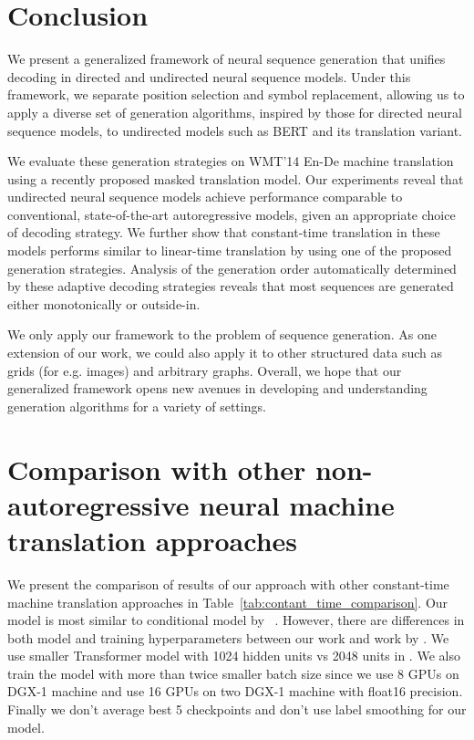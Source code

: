 \documentclass{article}
\begin{document}
\section{Conclusion}

We present a generalized framework of neural sequence generation that unifies decoding in directed and undirected neural sequence models. Under this framework, we separate position selection and symbol replacement, allowing us to apply a diverse set of generation algorithms, inspired by those for directed neural sequence models, to undirected models such as BERT and its translation variant. 

We evaluate these generation strategies on WMT'14 En-De machine translation using a recently proposed masked translation model. 
Our experiments reveal that undirected neural sequence models achieve performance comparable to conventional, state-of-the-art autoregressive models, given an appropriate choice of decoding strategy. 
We further show that constant-time translation in these models performs similar to linear-time translation by using one of the proposed generation strategies. Analysis of the generation order automatically determined by these adaptive decoding strategies reveals that most sequences are generated either monotonically or outside-in.

We only apply our framework to the problem of sequence generation. As one extension of our work, we could also apply it to other structured data such as grids (for e.g. images) and arbitrary graphs. Overall, we hope that our generalized framework opens new avenues in developing and understanding generation algorithms for a variety of settings.



\clearpage
\appendix
\section{Comparison with other non-autoregressive neural machine translation approaches}\label{ax:nonautoregressive}
We present the comparison of results of our approach with other constant-time machine translation approaches in Table~\ref{tab:contant_time_comparison}. Our model is most similar to conditional model by ~\cite{ghazvininejad2019constant}. However, there are differences in both model and training hyperparameters between our work and work by \cite{ghazvininejad2019constant}. We use smaller Transformer model with 1024 hidden units vs 2048 units in \citep{ghazvininejad2019constant}. We also train the model with more than twice smaller batch size since we use 8 GPUs on DGX-1 machine and \cite{ghazvininejad2019constant} use 16 GPUs on two DGX-1 machine with float16 precision. Finally we don’t average best 5 checkpoints and don’t use label smoothing for our model.
\end{document}

